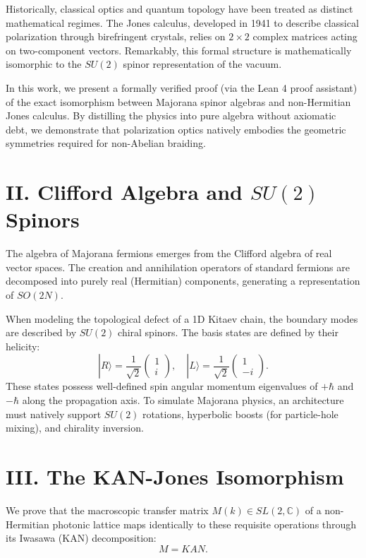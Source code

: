 \documentclass[aps,prx,twocolumn,superscriptaddress,amsmath,amssymb]{revtex4-2}
\begin{document}
Historically, classical optics and quantum topology have been treated as distinct mathematical regimes. The Jones calculus, developed in 1941 to describe classical polarization through birefringent crystals, relies on $2 \times 2$ complex matrices acting on two-component vectors. Remarkably, this formal structure is mathematically isomorphic to the $SU(2)$ spinor representation of the vacuum. 

In this work, we present a formally verified proof (via the Lean 4 proof assistant) of the exact isomorphism between Majorana spinor algebras and non-Hermitian Jones calculus. By distilling the physics into pure algebra without axiomatic debt, we demonstrate that polarization optics natively embodies the geometric symmetries required for non-Abelian braiding.

\section{II. Clifford Algebra and $SU(2)$ Spinors}
The algebra of Majorana fermions emerges from the Clifford algebra of real vector spaces. The creation and annihilation operators of standard fermions are decomposed into purely real (Hermitian) components, generating a representation of $SO(2N)$. 

When modeling the topological defect of a 1D Kitaev chain, the boundary modes are described by $SU(2)$ chiral spinors. The basis states are defined by their helicity:
\begin{equation}
|R\rangle = \frac{1}{\sqrt{2}} \begin{pmatrix} 1 \\ i \end{pmatrix}, \quad |L\rangle = \frac{1}{\sqrt{2}} \begin{pmatrix} 1 \\ -i \end{pmatrix}.
\end{equation}
These states possess well-defined spin angular momentum eigenvalues of $+\hbar$ and $-\hbar$ along the propagation axis. To simulate Majorana physics, an architecture must natively support $SU(2)$ rotations, hyperbolic boosts (for particle-hole mixing), and chirality inversion.

\section{III. The KAN-Jones Isomorphism}
We prove that the macroscopic transfer matrix $M(k) \in SL(2, \mathbb{C})$ of a non-Hermitian photonic lattice maps identically to these requisite operations through its Iwasawa (KAN) decomposition:
\begin{equation}
M = K A N.
\end{equation}
\end{document}
